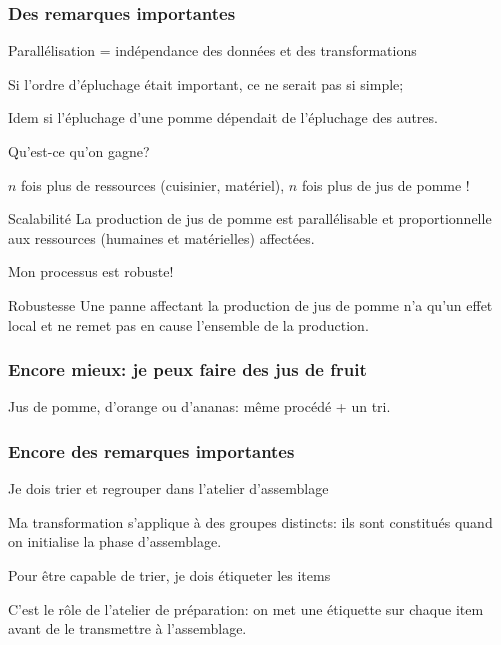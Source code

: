 \begin{frame}[fragile]
\frametitle{Des remarques importantes}

\alert{Parallélisation = indépendance des données et des transformations}

\medskip
Si l'ordre d'épluchage était important, ce ne serait pas si simple;

\smallskip

Idem si l'épluchage d'une pomme dépendait de l'épluchage des autres. 

\vfill

\alert{Qu'est-ce qu'on gagne?}

\medskip

$n$ fois plus de ressources (cuisinier, matériel),  $n$ fois plus de jus de pomme !

\medskip

\begin{defblock}{Scalabilité}
La production de jus de pomme est parallélisable et proportionnelle aux ressources
   (humaines et matérielles) affectées.
\end{defblock}

\smallskip

Mon processus est robuste!

\begin{defblock}{Robustesse}
Une panne affectant la production de jus de pomme n'a qu'un effet \alert{local}
   et ne remet pas en cause \alert{l'ensemble} de la production.
\end{defblock}

\end{frame}



\begin{frame}[fragile]
\frametitle{Encore mieux: je peux faire des jus de fruit}

Jus de pomme, d'orange ou d'ananas: même procédé + un \alert{tri}.


\end{frame}



\begin{frame}[fragile]
\frametitle{Encore des remarques importantes}

\alert{Je dois trier et regrouper dans l'atelier d'assemblage}

\medskip

Ma transformation s'applique à des groupes distincts: ils sont
constitués quand on initialise la phase d'assemblage.

\vfill


\alert{Pour être capable de trier, je dois étiqueter les items}

\medskip

C'est le rôle de l'atelier de préparation: on met une étiquette
sur chaque item avant de le transmettre à l'assemblage.


\end{frame}



